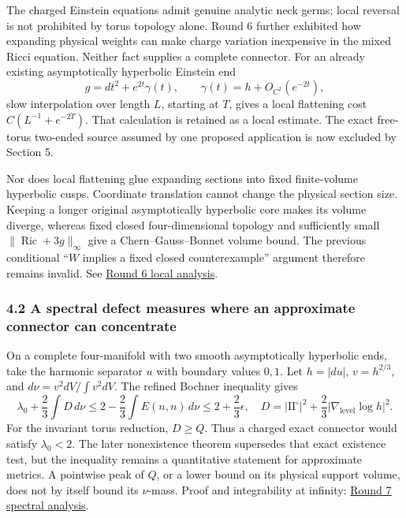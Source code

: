 \documentclass[
  english,
]{article}
\begin{document}
The charged Einstein equations admit genuine analytic neck germs; local
reversal is not prohibited by torus topology alone. Round 6 further
exhibited how expanding physical weights can make charge variation
inexpensive in the mixed Ricci equation. Neither fact supplies a
complete connector. For an already existing asymptotically hyperbolic
Einstein end \[
 g=dt^2+e^{2t}\gamma(t),\qquad
 \gamma(t)=h+O_{C^2}(e^{-2t}),
\] slow interpolation over length \(L\), starting at \(T\), gives a
local flattening cost \(C(L^{-1}+e^{-2T})\). That calculation is
retained as a local estimate. The exact free-torus two-ended source
assumed by one proposed application is now excluded by Section 5.

Nor does local flattening glue expanding sections into fixed
finite-volume hyperbolic cusps. Coordinate translation cannot change the
physical section size. Keeping a longer original asymptotically
hyperbolic core makes its volume diverge, whereas fixed closed
four-dimensional topology and sufficiently small
\(\|\operatorname{Ric}+3g\|_\infty\) give a Chern--Gauss--Bonnet volume
bound. The previous conditional ``\(W\) implies a fixed closed
counterexample'' argument therefore remains invalid. See
\href{../proofs/round6_global.md}{Round 6 local analysis}.

\hypertarget{a-spectral-defect-measures-where-an-approximate-connector-can-concentrate}{%
\subsubsection{4.2 A spectral defect measures where an approximate
connector can
concentrate}\label{a-spectral-defect-measures-where-an-approximate-connector-can-concentrate}}

On a complete four-manifold with two smooth asymptotically hyperbolic
ends, take the harmonic separator \(u\) with boundary values \(0,1\).
Let \(h=|du|\), \(v=h^{2/3}\), and \(d\nu=v^2dV/\int v^2dV\). The
refined Bochner inequality gives \[
 \lambda_0+\frac23\int D\,d\nu
 \le2-\frac23\int E(n,n)\,d\nu
 \le2+\frac23\epsilon,
 \quad
 D=|\mathrm{II}^{\circ}|^2+\frac23|\nabla_{\mathrm{level}}\log h|^2.
\] For the invariant torus reduction, \(D\ge Q\). Thus a charged exact
connector would satisfy \(\lambda_0<2\). The later nonexistence theorem
supersedes that exact existence test, but the inequality remains a
quantitative statement for approximate metrics. A pointwise peak of
\(Q\), or a lower bound on its physical support volume, does not by
itself bound its \(\nu\)-mass. Proof and integrability at infinity:
\href{../proofs/round7_spectral.md}{Round 7 spectral analysis}.
\end{document}
